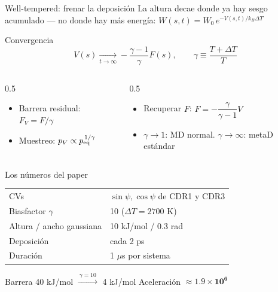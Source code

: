 \documentclass[aspectratio=169,11pt]{beamer}
\begin{document}
\begin{frame}{Well-tempered: frenar la deposición}
  La altura decae donde ya hay sesgo \alert{acumulado} — no donde hay más energía: $W(s,t) = W_0\, e^{-V(s,t)/k_B\Delta T}$
  \vspace{0.3em}
  \begin{block}{Convergencia}
    $$V(s) \xrightarrow[t\to\infty]{} -\frac{\gamma-1}{\gamma}F(s), \qquad \gamma \equiv \frac{T+\Delta T}{T}$$
  \end{block}
  \begin{columns}[T]
    \begin{column}{0.5\textwidth}
      \begin{itemize}
        \item Barrera residual: $F_V = F/\gamma$
        \item Muestreo: $p_V \propto p_{\text{eq}}^{\,1/\gamma}$
      \end{itemize}
    \end{column}
    \begin{column}{0.5\textwidth}
      \begin{itemize}
        \item Recuperar $F$: $F = -\dfrac{\gamma}{\gamma-1}V$
        \item $\gamma\to 1$: MD normal. $\gamma\to\infty$: metaD estándar
      \end{itemize}
    \end{column}
  \end{columns}
\end{frame}

\begin{frame}{Los números del paper}
  \begin{center}
  \begin{tabular}{ll}
    \toprule
    CVs & $\sin\psi,\cos\psi$ de CDR1 y CDR3 \\
    Biasfactor $\gamma$ & 10 \quad ($\Delta T = 2700$ K) \\
    Altura / ancho gaussiana & 10 kJ/mol / 0.3 rad \\
    Deposición & cada 2 ps \\
    Duración & 1 $\mu$s por sistema \\
    \bottomrule
  \end{tabular}
  \end{center}
  \vspace{0.8em}
  \centering
  Barrera 40 kJ/mol $\xrightarrow{\ \gamma=10\ }$ \alert{4 kJ/mol}
  \qquad
  Aceleración $\approx \mathbf{1.9\times10^{6}}$
\end{frame}
\end{document}
